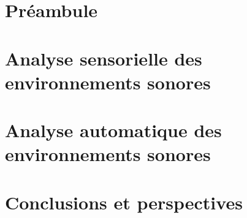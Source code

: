 \documentclass[ twoside,openright,titlepage,numbers=noenddot,headinclude,%
                footinclude=true,cleardoublepage=empty,abstractoff, %
                BCOR=5mm,paper=a4,fontsize=11pt,%
                francais,ngerman,american,%
                ]{scrreprt}
\begin{document}
\frenchspacing
\raggedbottom
{} %
\pagestyle{plain}




\cleardoublepage
\cleardoublepage
\cleardoublepage
\cleardoublepage
\pagestyle{scrheadings}
\cleardoublepage

\cleardoublepage{}

\cleardoublepage
{}
\part{Préambule}



\cleardoublepage
{}
\part{Analyse sensorielle des environnements sonores}




\cleardoublepage
{}
\part{Analyse automatique des environnements sonores}




\cleardoublepage
{}
\part{Conclusions et perspectives}



\appendix
\cleardoublepage
\end{document}
